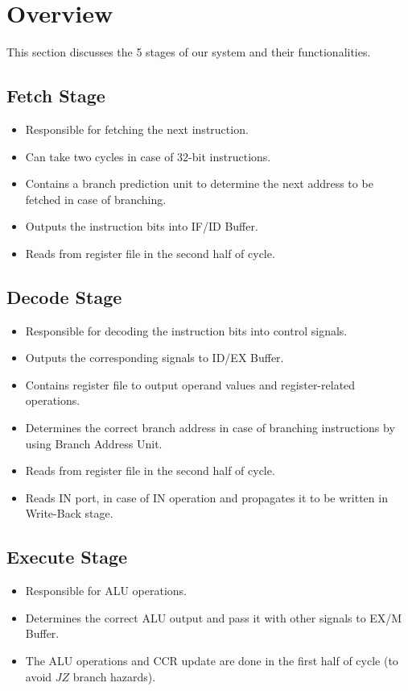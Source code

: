 \section{Overview}
This section discusses the 5 stages of our system and their functionalities.

\subsection{Fetch Stage}
\begin{itemize}
    \item Responsible for fetching the next instruction.
    \item Can take two cycles in case of 32-bit instructions.
    \item Contains a branch prediction unit to determine the next address to be fetched in case of branching.
    \item Outputs the instruction bits into IF/ID Buffer.
    \item Reads from register file in the second half of cycle.
\end{itemize}

\subsection{Decode Stage}
\begin{itemize}
    \item Responsible for decoding the instruction bits into control signals.
    \item Outputs the corresponding signals to ID/EX Buffer.
    \item Contains register file to output operand values and register-related operations.
    \item Determines the correct branch address in case of branching instructions by using Branch Address Unit.
    \item Reads from register file in the second half of cycle.
    \item Reads IN port, in case of IN operation and propagates it to be written in Write-Back stage.
\end{itemize}

\subsection{Execute Stage}
\begin{itemize}
    \item Responsible for ALU operations.
    \item Determines the correct ALU output and pass it with other signals to EX/M Buffer.
    \item The ALU operations and CCR update are done in the first half of cycle (to avoid $JZ$ branch hazards).
\end{itemize}

